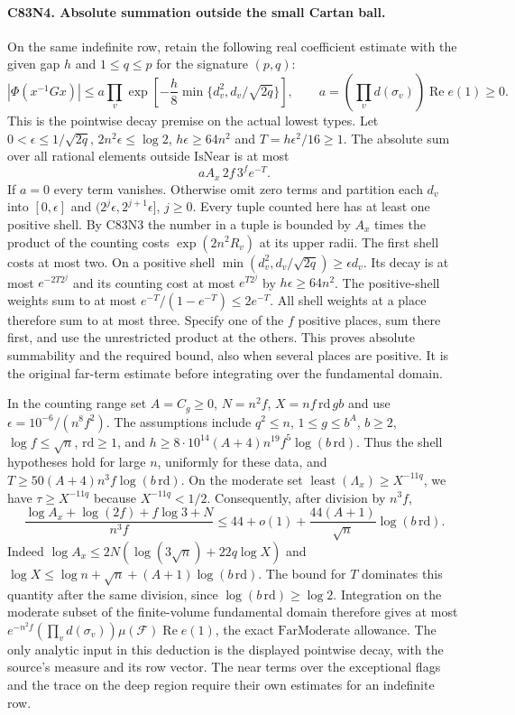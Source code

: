 \paragraph{C83N4. Absolute summation outside the small Cartan ball.}
On the same indefinite row, retain the following real
coefficient estimate with the given gap $h$ and
$1\le q\le p$ for the signature $(p,q)$:
\[
 |\Phi(x^{-1}Gx)|\le a\prod_v
 \exp\!\left[-\frac h8\min\{d_v^2,d_v/\sqrt{2q}\}\right],
 \qquad a=(\prod_v d(\sigma_v))\operatorname{Re}e(1)\ge0 .
\]
This is the pointwise decay premise on the actual lowest types.
Let $0<\epsilon\le1/\sqrt{2q}$, $2n^2\epsilon\le\log2$,
$h\epsilon\ge64n^2$ and $T=h\epsilon^2/16\ge1$.
The absolute sum over all rational elements outside
$\mathrm{IsNear}$ is at most
\[
          a A_x\,2f\,3^f e^{-T}.
\]
If $a=0$ every term vanishes. Otherwise omit zero terms and
partition each $d_v$ into $[0,\epsilon]$ and
$(2^j\epsilon,2^{j+1}\epsilon]$, $j\ge0$. Every tuple
counted here has at least one positive shell. By C83N3 the
number in a tuple is bounded by $A_x$ times the product of
the counting costs $\exp(2n^2 R_v)$ at its upper radii.
The first shell costs at most two. On a positive shell
$\min(d_v^2,d_v/\sqrt{2q})\ge\epsilon d_v$.
Its decay is at most $e^{-2T2^j}$ and its counting cost at
most $e^{T2^j}$ by $h\epsilon\ge64n^2$. The positive-shell
weights sum to at most $e^{-T}/(1-e^{-T})\le2e^{-T}$.
All shell weights at a place therefore sum to at most three.
Specify one of the $f$ positive places, sum there first, and
use the unrestricted product at the others. This proves
absolute summability and the required bound, also when several
places are positive. It is the original far-term estimate
before integrating over the fundamental domain.

In the counting range set $A=C_g\ge0$, $N=n^2f$,
$X=nf\,\mathrm{rd}\,g b$ and use $\epsilon=10^{-6}/(n^8f^2)$.
The assumptions include $q^2\le n$, $1\le g\le b^A$,
$b\ge2$, $\log f\le\sqrt n$, $\mathrm{rd}\ge1$, and
$h\ge8\cdot10^{14}(A+4)n^{19}f^5\log(b\,\mathrm{rd})$.
Thus the shell hypotheses hold for large $n$, uniformly for
these data, and $T\ge50(A+4)n^3 f\log(b\,\mathrm{rd})$.
On the moderate set $\operatorname{least}(\Lambda_x)\ge X^{-11q}$,
we have $\tau\ge X^{-11q}$ because $X^{-11q}<1/2$.
Consequently, after division by $n^3f$,
\[
 \frac{\log A_x+\log(2f)+f\log3+N}{n^3 f}
 \le 44+o(1)+\frac{44(A+1)}{\sqrt n}\log(b\,\mathrm{rd}).
\]
Indeed $\log A_x\le2N(\log(3\sqrt n)+22q\log X)$ and
$\log X\le\log n+\sqrt n+(A+1)\log(b\,\mathrm{rd})$.
The bound for $T$ dominates this quantity after the same
division, since $\log(b\,\mathrm{rd})\ge\log2$. Integration
on the moderate subset of the finite-volume fundamental domain
therefore gives at most
$e^{-n^2f}(\prod_v d(\sigma_v))\mu(\mathscr F)\operatorname{Re}e(1)$,
the exact $\mathrm{FarModerate}$ allowance. The only analytic
input in this deduction is the displayed pointwise decay,
with the source's measure and its row vector. The near terms
over the exceptional flags and the trace on the deep region
require their own estimates for an indefinite row.
